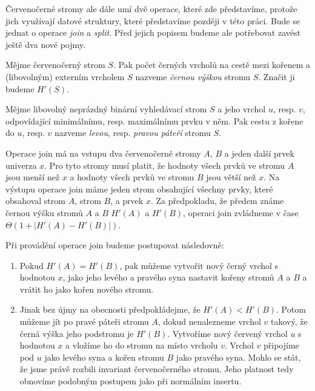 Červenočerné stromy ale dále umí dvě operace, které zde představíme, protože
jich využívají datové struktury, které představíme později v této práci. Bude se jednat o operace \emph{join} a \emph{split}.
Před jejich popisem budeme ale potřebovat zavést ještě dva nové pojmy.

\begin{definice}
Mějme červenočerný strom $S$. Pak počet černých vrcholů na cestě mezi kořenem a (libovolným) externím vrcholem $S$ nazveme \emph{černou výškou} stromu $S$. Značit ji budeme $H'(S)$.
\end{definice}


\begin{definice}
Mějme libovolný neprázdný binární vyhledávací strom $S$ a jeho vrchol $u$, resp. $v$, odpovídající minimálnímu, resp. maximálnímu prvku v něm. Pak cestu z kořene do $u$, resp. $v$ nazveme \emph{levou}, resp. \emph{pravou páteří} stromu $S$.
\end{definice}

Operace join má na vstupu dva červenočerné
stromy $A$, $B$ a jeden další prvek univerza $x$. Pro tyto stromy musí platit,
že hodnoty všech prvků ve stromu $A$ jsou menší než $x$ a hodnoty všech prvků
ve stromu $B$ jsou větší než $x$. Na výstupu operace join máme jeden strom
obsahující všechny prvky, které obsahoval strom $A$, strom $B$, a prvek $x$. Za
předpokladu, že předem známe černou výšku stromů $A$
a $B$ $H'(A)$ a $H'(B)$, operaci join zvládneme v čase $\Theta(1+|H'(A) -
H'(B)|)$.

Při provádění operace join budeme postupovat následovně:

\begin{enumerate}
\item Pokud $H'(A) = H'(B)$, pak můžeme vytvořit nový černý vrchol s hodnotou $x$, jako jeho levého a pravého syna nastavit kořeny stromů $A$ a $B$ a vrátit ho jako kořen nového stromu.
\item Jinak bez újmy na obecnosti předpokládejme, že $H'(A)<H'(B)$. Potom můžeme jít po pravé páteři stromu $A$, dokud nenalezneme vrchol $v$ takový, že černá výška jeho podstromu je $H'(B)$. Vytvoříme nový červený vrchol $u$ s hodnotou $x$ a vložíme ho do stromu na místo vrcholu $v$. Vrchol $v$ připojíme pod $u$ jako levého syna a kořen stromu $B$ jako pravého syna. Mohlo se stát, že jsme právě rozbili invariant červenočerného stromu. Jeho platnost tedy obnovíme podobným postupem jako při normálním insertu.
\end{enumerate}

